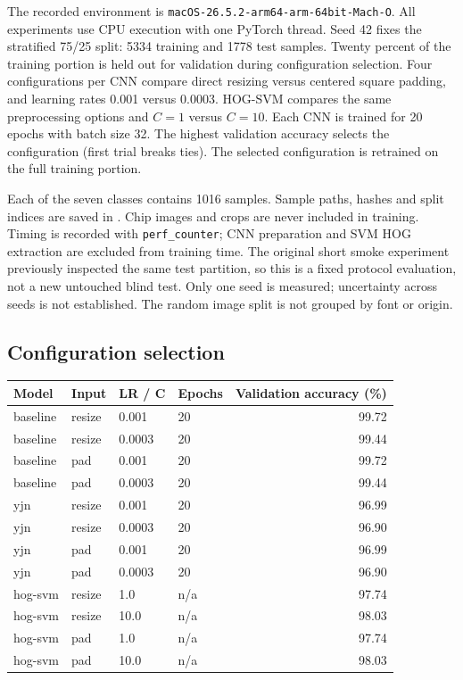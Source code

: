 The recorded environment is \texttt{macOS-26.5.2-arm64-arm-64bit-Mach-O}. All experiments use CPU execution
with one PyTorch thread. Seed 42 fixes the stratified 75/25 split: 5334
training and 1778 test samples. Twenty percent of the training portion
is held out for validation during configuration selection. Four configurations
per CNN compare direct resizing versus centered square padding, and learning
rates 0.001 versus 0.0003. HOG-SVM compares the same preprocessing options
and $C=1$ versus $C=10$. Each CNN is trained for 20 epochs with batch size 32.
The highest validation accuracy selects the configuration (first trial breaks
ties). The selected configuration is retrained on the full training portion.

Each of the seven classes contains 1016 samples. Sample paths, hashes and
split indices are saved in .
Chip images and crops are never included in training. Timing is recorded
with \texttt{perf\_counter}; CNN preparation and SVM HOG extraction are excluded
from training time. The original short smoke experiment previously inspected
the same test partition, so this is a fixed protocol evaluation, not a new
untouched blind test. Only one seed is measured; uncertainty across seeds
is not established. The random image split is not grouped by font or origin.
\subsection{Configuration selection}\begin{center}\begin{tabular}{llllr}\toprule
Model & Input & LR / C & Epochs & Validation accuracy (\%) \\ \midrule
baseline & resize & 0.001 & 20 & 99.72 \\
baseline & resize & 0.0003 & 20 & 99.44 \\
baseline & pad & 0.001 & 20 & 99.72 \\
baseline & pad & 0.0003 & 20 & 99.44 \\
yjn & resize & 0.001 & 20 & 96.99 \\
yjn & resize & 0.0003 & 20 & 96.90 \\
yjn & pad & 0.001 & 20 & 96.99 \\
yjn & pad & 0.0003 & 20 & 96.90 \\
hog-svm & resize & 1.0 & n/a & 97.74 \\
hog-svm & resize & 10.0 & n/a & 98.03 \\
hog-svm & pad & 1.0 & n/a & 97.74 \\
hog-svm & pad & 10.0 & n/a & 98.03 \\
\bottomrule\end{tabular}\end{center}
